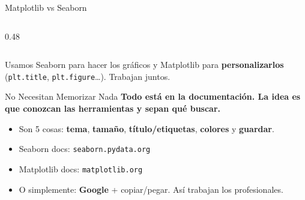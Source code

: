 \documentclass[aspectratio=169, 11pt]{beamer}
\begin{document}
\begin{frame}{Matplotlib vs Seaborn}
\begin{columns}[T]
\begin{column}{0.48\textwidth}
      \vspace{4pt}
      \begin{center}
      \end{center}
    \end{column}
  \end{columns}

  \vspace{6pt}
  {\footnotesize\color{arcaDark}
    \faLightbulb\hspace{4pt}
    Usamos Seaborn para hacer los gráficos y Matplotlib para
    \textbf{personalizarlos} (\texttt{plt.title}, \texttt{plt.figure}\ldots).
    Trabajan juntos.}
\end{frame}

\begin{frame}{No Necesitan Memorizar Nada}
  \vspace{-4pt}
  {\footnotesize\color{arcaDark}\bfseries
    Todo está en la documentación. La idea es que conozcan
    las herramientas y sepan \textbf{qué buscar}.}

  \vspace{8pt}
  {\footnotesize
  \begin{itemize}\setlength{\itemsep}{6pt}
    \item[{\color{arcaRed}\scriptsize\faArrowRight}]
      Son 5 cosas: \textbf{tema}, \textbf{tamaño},
      \textbf{título/etiquetas}, \textbf{colores}
      y \textbf{guardar}.
    \item[{\color{arcaRed}\scriptsize\faArrowRight}]
      Seaborn docs: \texttt{seaborn.pydata.org}
    \item[{\color{arcaRed}\scriptsize\faArrowRight}]
      Matplotlib docs: \texttt{matplotlib.org}
    \item[{\color{arcaRed}\scriptsize\faArrowRight}]
      O simplemente: \textbf{Google} + copiar/pegar.
      Así trabajan los profesionales.
  \end{itemize}
  }
\end{frame}
\end{document}

